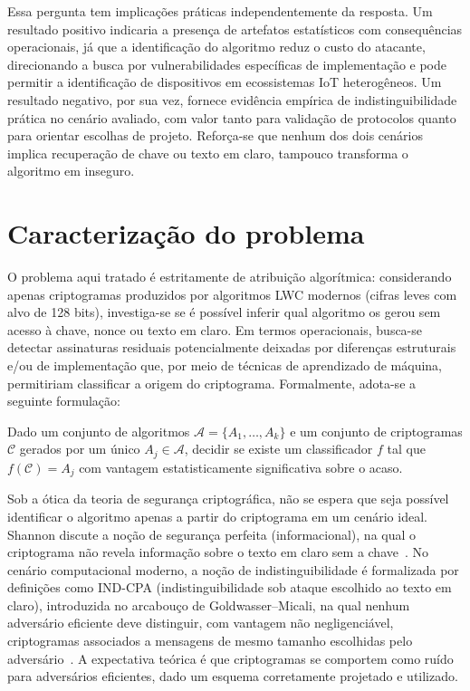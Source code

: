 Essa pergunta tem implicações práticas independentemente da resposta. Um resultado positivo indicaria a presença de artefatos estatísticos com consequências operacionais, já que a identificação do algoritmo reduz o custo do atacante, direcionando a busca por vulnerabilidades específicas de implementação e pode permitir a identificação de dispositivos em ecossistemas IoT heterogêneos. Um resultado negativo, por sua vez, fornece evidência empírica de indistinguibilidade prática no cenário avaliado, com valor tanto para validação de protocolos quanto para orientar escolhas de projeto. Reforça-se que nenhum dos dois cenários implica recuperação de chave ou texto em claro, tampouco transforma o algoritmo em inseguro.


















\section{Caracterização do problema}

O problema aqui tratado é estritamente de atribuição algorítmica: considerando
apenas criptogramas produzidos por algoritmos LWC modernos (cifras leves com
alvo de 128 bits), investiga-se se é possível inferir qual algoritmo os gerou
sem acesso à chave, nonce ou texto em claro. Em termos operacionais, busca-se
detectar assinaturas residuais potencialmente deixadas por diferenças
estruturais e/ou de implementação que, por meio de técnicas de aprendizado de
máquina, permitiriam classificar a origem do criptograma. Formalmente, adota-se
a seguinte formulação:

Dado um conjunto de algoritmos $\mathcal{A}=\{A_1,\ldots,A_k\}$ e um conjunto
de criptogramas $\mathcal{C}$ gerados por um único
$A_j \in \mathcal{A}$,
decidir se existe um classificador $f$ tal que $f(\mathcal{C}) = A_j$ com
vantagem estatisticamente significativa sobre o acaso.

Sob a ótica da teoria de segurança criptográfica, não se espera que seja
possível identificar o algoritmo apenas a partir do criptograma em um cenário
ideal. Shannon discute a noção de segurança perfeita (informacional), na qual o
criptograma não revela informação sobre o texto em claro sem a
chave~\cite{ShannonWeaver1949MTC}. No cenário computacional moderno, a noção de
indistinguibilidade é formalizada por definições como IND-CPA
(indistinguibilidade sob ataque escolhido ao texto em claro), introduzida no
arcabouço de Goldwasser--Micali, na qual nenhum adversário eficiente deve
distinguir, com vantagem não negligenciável, criptogramas associados a mensagens
de mesmo tamanho escolhidas pelo
adversário~\cite{GoldwasserMicali1984PE}. A expectativa teórica é que
criptogramas se comportem como ruído para adversários eficientes, dado um
esquema corretamente projetado e utilizado.

